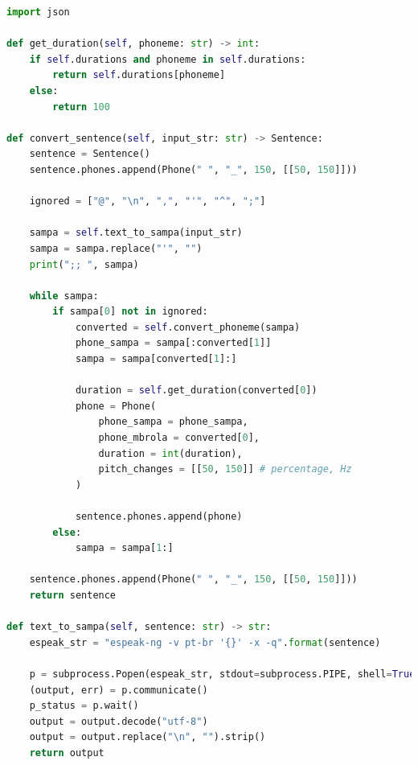 \begin{lstlisting}[caption=Gerador de f0 a partir do modelo INTSINT, label=intsintpy, language=Python]
import json

def get_duration(self, phoneme: str) -> int:
    if self.durations and phoneme in self.durations:
        return self.durations[phoneme]
    else:
        return 100

def convert_sentence(self, input_str: str) -> Sentence:
    sentence = Sentence()
    sentence.phones.append(Phone(" ", "_", 150, [[50, 150]]))

    ignored = ["@", "\n", ",", "'", "^", ";"]

    sampa = self.text_to_sampa(input_str)
    sampa = sampa.replace("'", "")
    print(";; ", sampa)

    while sampa:
        if sampa[0] not in ignored:
            converted = self.convert_phoneme(sampa)
            phone_sampa = sampa[:converted[1]]
            sampa = sampa[converted[1]:]

            duration = self.get_duration(converted[0])
            phone = Phone(
                phone_sampa = phone_sampa,
                phone_mbrola = converted[0],
                duration = int(duration),
                pitch_changes = [[50, 150]] # percentage, Hz
            )

            sentence.phones.append(phone)
        else:
            sampa = sampa[1:]

    sentence.phones.append(Phone(" ", "_", 150, [[50, 150]]))
    return sentence

def text_to_sampa(self, sentence: str) -> str:
    espeak_str = "espeak-ng -v pt-br '{}' -x -q".format(sentence)

    p = subprocess.Popen(espeak_str, stdout=subprocess.PIPE, shell=True)
    (output, err) = p.communicate()
    p_status = p.wait()
    output = output.decode("utf-8")
    output = output.replace("\n", "").strip()
    return output
\end{lstlisting}
